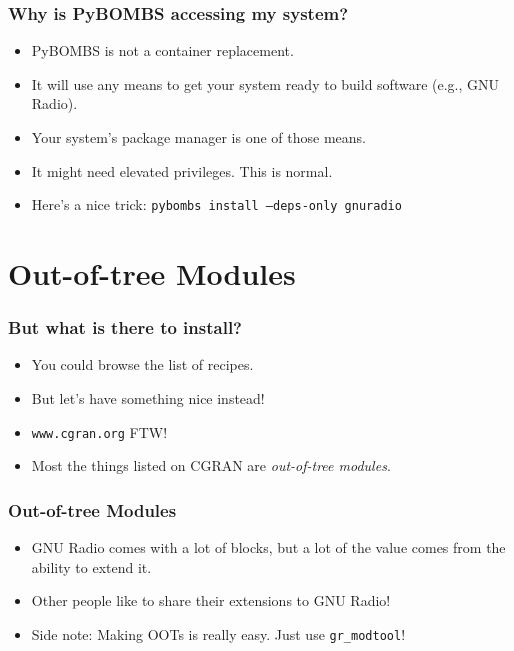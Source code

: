 \documentclass{beamer}
\begin{document}
\begin{frame}
  \frametitle{Why is PyBOMBS accessing my system?}
  \begin{itemize}
    \item PyBOMBS is not a container replacement.
    \item It will use any means to get your system ready to build software (e.g., GNU Radio).
    \item Your system's package manager is one of those means.
    \item It might need elevated privileges. This is normal.
    \item Here's a nice trick: \texttt{pybombs install --deps-only gnuradio}
  \end{itemize}
\end{frame}

\section{Out-of-tree Modules}
\begin{frame}
  \frametitle{But what is there to install?}
  \begin{itemize}
    \item You could browse the list of recipes.
    \item But let's have something nice instead!
    \item \texttt{www.cgran.org} FTW\@!
    \item Most the things listed on CGRAN are \emph{out-of-tree modules}.
  \end{itemize}
\end{frame}

\begin{frame}
  \frametitle{Out-of-tree Modules}
  \begin{itemize}
    \item GNU Radio comes with a lot of blocks, but a lot of the value comes from the ability to extend it.
    \item Other people like to share their extensions to GNU Radio!
    \item Side note: Making OOTs is really easy. Just use \texttt{gr\_modtool}!
  \end{itemize}
\end{frame}
\end{document}
